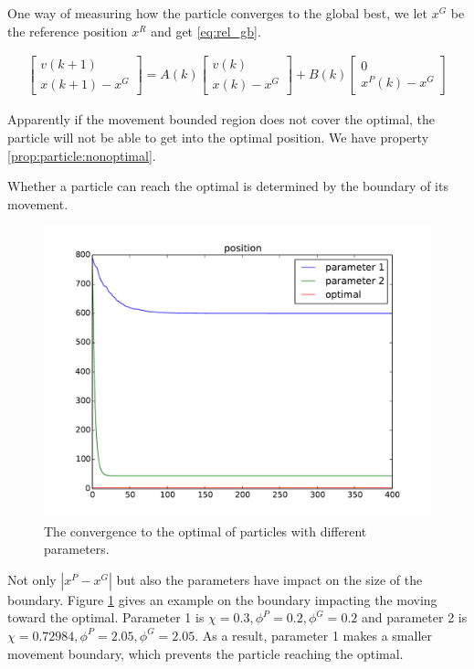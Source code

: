 One way of measuring how the particle converges to the global best, we let $ x^{G} $ be the reference position $ x^{R} $ and get \eqref{eq:rel_gb}.

\begin{equation}
\label{eq:rel_gb}
\begin{aligned}
\begin{bmatrix}
v(k+1) \\
x(k+1) - x^{G}
\end{bmatrix}
 = A(k) 
\begin{bmatrix}
v(k) \\
x(k) - x^{G}
\end{bmatrix}
+ B(k) 
\begin{bmatrix}
0 \\
x^{P}(k) - x^{G}
\end{bmatrix}
\end{aligned}
\end{equation}

Apparently if the movement bounded region does not cover the optimal, the particle will not be able to get into the optimal position.
We have property \ref{prop:particle:nonoptimal}.

\begin{myprop}
\label{prop:particle:nonoptimal}
Whether a particle can reach the optimal is determined by the boundary of its movement.
\end{myprop}

\begin{figure}[tbph]
\centering
\includegraphics[width=0.7\linewidth]{./simfig/bound/bound_position}
\caption{The convergence to the optimal of particles with different parameters.}
\label{fig:bound_position}
\end{figure}

Not only $ | x^{P} - x^{G} | $ but also the parameters have impact on the size of the boundary.
Figure \ref{fig:bound_position} gives an example on the boundary impacting the moving toward the optimal.
Parameter 1 is $ \chi = 0.3, \phi^{P} = 0.2, \phi^{G} = 0.2 $ and parameter 2 is $ \chi = 0.72984, \phi^{P} = 2.05, \phi^{G} = 2.05 $.
As a result, parameter 1 makes a smaller movement boundary, which prevents the particle reaching the optimal.

